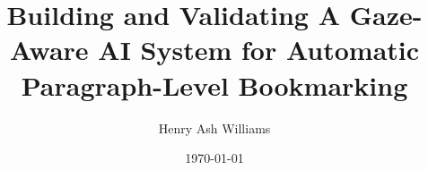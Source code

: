 \title{Building and Validating A Gaze-Aware AI System for Automatic Paragraph-Level Bookmarking}
\author{Henry Ash Williams}
\date{\today}


\maketitle
